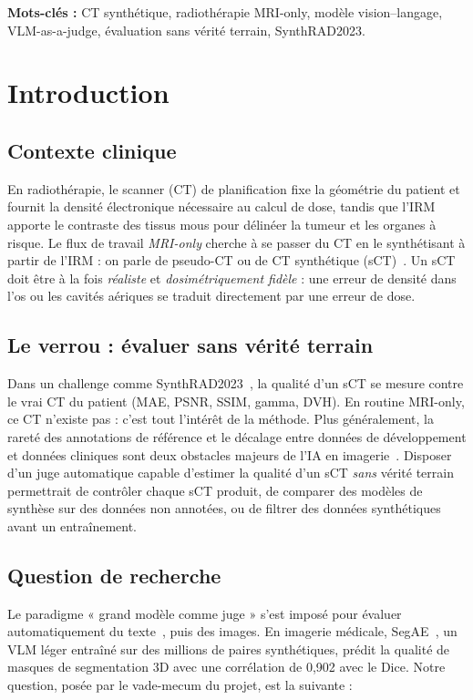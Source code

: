 \documentclass[11pt,a4paper]{article}
\begin{document}
\vspace{0.4em}
\noindent\textbf{Mots-clés :} CT synthétique, radiothérapie MRI-only, modèle vision--langage, VLM-as-a-judge, évaluation sans vérité terrain, SynthRAD2023.

\tableofcontents
\newpage

\section{Introduction}
\label{sec:intro}

\subsection{Contexte clinique}
En radiothérapie, le scanner (CT) de planification fixe la géométrie du patient et fournit la densité électronique nécessaire au calcul de dose, tandis que l'IRM apporte le contraste des tissus mous pour délinéer la tumeur et les organes à risque. Le flux de travail \emph{MRI-only} cherche à se passer du CT en le synthétisant à partir de l'IRM : on parle de pseudo-CT ou de CT synthétique (sCT)~\cite{bourbonne2021,huijben2024synthrad}. Un sCT doit être à la fois \emph{réaliste} et \emph{dosimétriquement fidèle} : une erreur de densité dans l'os ou les cavités aériques se traduit directement par une erreur de dose.

\subsection{Le verrou : évaluer sans vérité terrain}
Dans un challenge comme SynthRAD2023~\cite{thummerer2023synthrad,huijben2024synthrad}, la qualité d'un sCT se mesure contre le vrai CT du patient (MAE, PSNR, SSIM, gamma, DVH). En routine MRI-only, ce CT n'existe pas : c'est tout l'intérêt de la méthode. Plus généralement, la rareté des annotations de référence et le décalage entre données de développement et données cliniques sont deux obstacles majeurs de l'IA en imagerie~\cite{castro2020causality}. Disposer d'un juge automatique capable d'estimer la qualité d'un sCT \emph{sans} vérité terrain permettrait de contrôler chaque sCT produit, de comparer des modèles de synthèse sur des données non annotées, ou de filtrer des données synthétiques avant un entraînement.

\subsection{Question de recherche}
Le paradigme « grand modèle comme juge » s'est imposé pour évaluer automatiquement du texte~\cite{zheng2023judging}, puis des images. En imagerie médicale, SegAE~\cite{chen2026segae}, un VLM léger entraîné sur des millions de paires synthétiques, prédit la qualité de masques de segmentation 3D avec une corrélation de 0,902 avec le Dice. Notre question, posée par le vade-mecum du projet, est la suivante :
\end{document}
